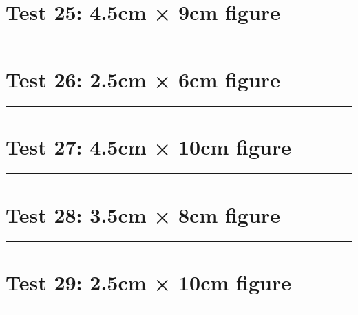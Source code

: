 \documentclass[a4paper,11pt]{article}
\begin{document}
\section*{Test 25: 4.5cm × 9cm figure}
\begin{swarmwrap}%
  \begin{minipage}[t]{4cm}
    \centering
    \rule{\linewidth}{9cm}
  \end{minipage}%
\end{swarmwrap}%
\swarmwrapnext
\lipsum[119]
\lipsum[120]
\lipsum[121]
\lipsum[122]
\lipsum[123]
\lipsum[124]
\section*{Test 26: 2.5cm × 6cm figure}
\begin{swarmwrap}%
  \begin{minipage}[t]{2cm}
    \centering
    \rule{\linewidth}{6cm}
  \end{minipage}%
\end{swarmwrap}%
\swarmwrapnext
\lipsum[65]
\lipsum[66]
\lipsum[67]
\lipsum[68]
\section*{Test 27: 4.5cm × 10cm figure}
\begin{swarmwrap}%
  \begin{minipage}[t]{4cm}
    \centering
    \rule{\linewidth}{10cm}
  \end{minipage}%
\end{swarmwrap}%
\swarmwrapnext
\lipsum[1]
\lipsum[2]
\lipsum[3]
\lipsum[4]
\lipsum[5]
\section*{Test 28: 3.5cm × 8cm figure}
\begin{swarmwrap}%
  \begin{minipage}[t]{3cm}
    \centering
    \rule{\linewidth}{8cm}
  \end{minipage}%
\end{swarmwrap}%
\swarmwrapnext
\lipsum[58]
\lipsum[59]
\lipsum[60]
\lipsum[61]
\lipsum[62]
\section*{Test 29: 2.5cm × 10cm figure}
\begin{swarmwrap}%
  \begin{minipage}[t]{2cm}
    \centering
    \rule{\linewidth}{10cm}
  \end{minipage}%
\end{swarmwrap}%
\swarmwrapnext
\lipsum[25]
\lipsum[26]
\lipsum[27]
\lipsum[28]
\lipsum[29]
\lipsum[30]
\end{document}
